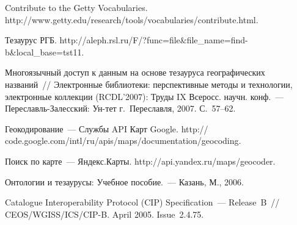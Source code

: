 \begin{multicols}{2}
{{\begin{thebibliography}{99}
Contribute to the Getty Vocabularies. {\sf 
http://www.\linebreak getty.edu/research/tools/vocabularies/contribute.html}.

Тезаурус РГБ. {\sf http://aleph.rsl.ru/F/?func=file\&file\_\linebreak name=find-b\&local\_base=tst11}.

Многоязычный доступ к данным на основе тезауруса географических названий~// 
Электронные библиотеки: перспективные методы и технологии, электронные коллекции 
(RCDL'2007):\linebreak
 Труды IX Всеросс. научн. конф.~--- Пе\-ре\-славль-За\-лес\-ский: Ун-тет 
г.~Переславля, 2007. С.~57--62.

Геокодирование~--- Службы API Карт Google. {\sf 
http:// code.google.com/intl/ru/apis/maps/documentation/\linebreak geocoding}.

Поиск по карте~--- Яндекс.Карты. {\sf http://api.\linebreak yandex.ru/maps/geocoder}.

Онтологии и тезаурусы: Учебное пособие.~--- Казань, М., 2006.


\label{end\stat}

Catalogue Interoperability Protocol (CIP) Specification~--- Release~B~// 
CEOS/WGISS/ICS/CIP-B. April 2005. Issue~2.4.75.

  
 \end{thebibliography}
}
}


\end{multicols}